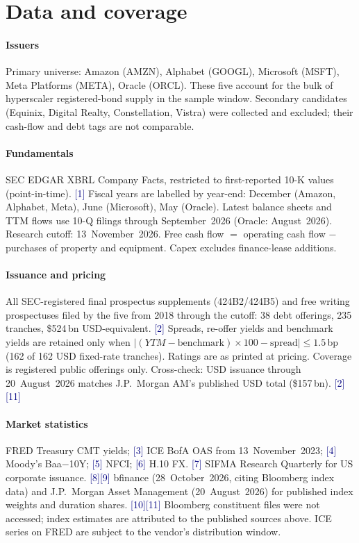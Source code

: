 \documentclass[10pt,letterpaper]{article}
\newcommand{\src}[1]{{\scriptsize\textcolor{navy}{[#1]}}}
\begin{document}
\section{Data and coverage}

\paragraph{Issuers}
Primary universe: Amazon (AMZN), Alphabet (GOOGL), Microsoft (MSFT), Meta Platforms (META), Oracle (ORCL). These five account for the bulk of hyperscaler registered-bond supply in the sample window. Secondary candidates (Equinix, Digital Realty, Constellation, Vistra) were collected and excluded; their cash-flow and debt tags are not comparable.

\paragraph{Fundamentals}
SEC EDGAR XBRL Company Facts, restricted to first-reported 10-K values (point-in-time). \src{1} Fiscal years are labelled by year-end: December (Amazon, Alphabet, Meta), June (Microsoft), May (Oracle). Latest balance sheets and TTM flows use 10-Q filings through September~2026 (Oracle: August~2026). Research cutoff: 13~November~2026. Free cash flow $=$ operating cash flow $-$ purchases of property and equipment. Capex excludes finance-lease additions.

\paragraph{Issuance and pricing}
All SEC-registered final prospectus supplements (424B2/424B5) and free writing prospectuses filed by the five from 2018 through the cutoff: 38 debt offerings, 235 tranches, \$524\,bn USD-equivalent. \src{2} Spreads, re-offer yields and benchmark yields are retained only when $|(YTM - \text{benchmark})\times 100 - \text{spread}| \le 1.5$\,bp (162 of 162 USD fixed-rate tranches). Ratings are as printed at pricing. Coverage is registered public offerings only. Cross-check: USD issuance through 20~August~2026 matches J.P.~Morgan AM's published USD total (\$157\,bn). \src{2}\src{11}

\paragraph{Market statistics}
FRED Treasury CMT yields; \src{3} ICE BofA OAS from 13~November~2023; \src{4} Moody's Baa$-$10Y; \src{5} NFCI; \src{6} H.10 FX. \src{7} SIFMA Research Quarterly for US corporate issuance. \src{8}\src{9} bfinance (28~October~2026, citing Bloomberg index data) and J.P.~Morgan Asset Management (20~August~2026) for published index weights and duration shares. \src{10}\src{11} Bloomberg constituent files were not accessed; index estimates are attributed to the published sources above. ICE series on FRED are subject to the vendor's distribution window.
\end{document}
